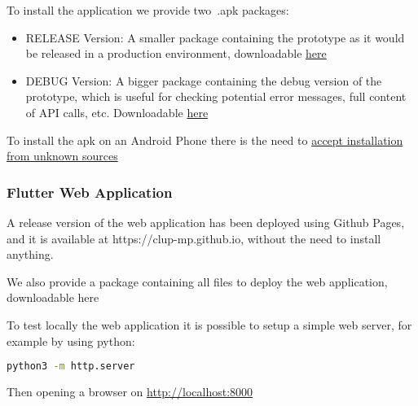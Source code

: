 To install the application we provide two~.apk packages:
\begin{itemize}
    \item RELEASE Version: A smaller package containing the prototype as it would be released in a production environment, downloadable \href{https://github.com/davidemerli/MerliPassarello/blob/master/DeliveryFolder/ITD/app-debug.apk?raw=true}{here}
    \item DEBUG Version: A bigger package containing the debug version of the prototype, which is useful for checking potential error messages, full content of API calls, etc. Downloadable \href{https://github.com/davidemerli/MerliPassarello/blob/master/DeliveryFolder/ITD/app-release.apk?raw=true}{here}
\end{itemize}

To install the apk on an Android Phone there is the need to \href{https://developer.android.com/distribute/marketing-tools/alternative-distribution#unknown-sources}{accept installation from unknown sources}

\subsubsection{Flutter Web Application}
A release version of the web application has been deployed using Github Pages, and it is available at https://clup-mp.github.io, without the need to install anything.

We also provide a package containing all files to deploy the web application, downloadable here

To test locally the web application it is possible to setup a simple web server, for example by using python:
\begin{lstlisting}[language=bash]
    python3 -m http.server
\end{lstlisting}
Then opening a browser on \href{http://localhost:8000}{http://localhost:8000}

